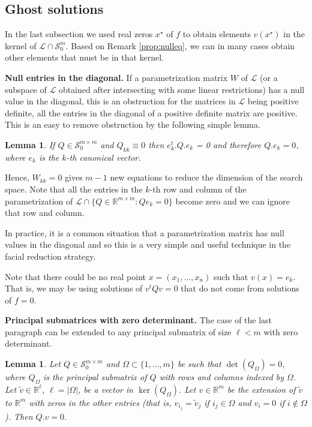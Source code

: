 \documentclass{amsart}
\newtheorem{lemma}[theorem]{Lemma}
\theoremstyle{definition}
\theoremstyle{remark}
\newtheorem{remark}[theorem]{Remark}
\numberwithin{equation}{section}
\newcommand{\Sym}{{\mathcal S}}
\newcommand{\eLL}{{\mathcal L}}
\newcommand{\R}{{\mathbb R}}
\begin{document}


\subsection{Ghost solutions}
In the last subsection we used real zeros $x^\star$ of $f$ to obtain elements $v(x^\star)$ in the kernel of $\eLL \cap \Sym_0^m$. Based on Remark \ref{prop:nulleq}, we can in many cases obtain other elements that must be in that kernel.

{\bf Null entries in the diagonal.} If a parametrization matrix $W$ of $\eLL$ (or a subspace of $\eLL$ obtained after intersecting with some linear restrictions) has a null value in the diagonal, this is an obstruction for the matrices in $\eLL$ being positive definite, all the entries in the diagonal of a positive definite matrix are positive. This is an easy to remove obstruction by the following simple lemma.

\begin{lemma}
If $Q \in \Sym_0^{m \times m}$ and $Q_{kk} \equiv 0$ then $e_k^t . Q . e_k$ = 0 and therefore $Q . e_k = 0$, where $e_k$ is the $k$-th canonical vector.
\end{lemma}

Hence, $W_{kk} = 0$ gives $m-1$ new equations to reduce the dimension of the search space. Note that all the entries in the $k$-th row and column of the parametrization of $\eLL \cap \{Q \in \R^{m\times m}: Q e_k = 0\}$ become zero and we can ignore that row and column.

In practice, it is a common situation that a parametrization matrix has null values in the diagonal and so this is a very simple and useful technique in the facial reduction strategy.

Note that there could be no real point $x = (x_1, \dots, x_n)$ such that $v(x) = e_{k}$. That is, we may be using solutions of $v^t Q v = 0$ that do not come from solutions of $f = 0$.


{\bf Principal submatrices with zero determinant.} The case of the last paragraph can be extended to any principal submatrix of size $\ell < m$ with zero determinant.
\begin{lemma}
Let $Q \in \Sym_0^{m \times m}$ and $\Omega \subset \{1, \dots, m\}$ be such that $\det(Q_\Omega) = 0$, where $Q_\Omega$ is the principal submatrix of $Q$ with rows and columns indexed by $\Omega$. Let $\tilde v \in \R^\ell$, $\ell = |\Omega|$, be a vector in $\ker(Q_\Omega)$. Let $v \in \R^m$ be the extension of $\tilde v$ to $\R^m$ with zeros in the other entries (that is, $v_{i_j} = \tilde v_j$ if $i_j \in \Omega$ and $v_i = 0$ if $i \not\in \Omega$). Then $Q . v = 0$.
\end{lemma}
\end{document}
